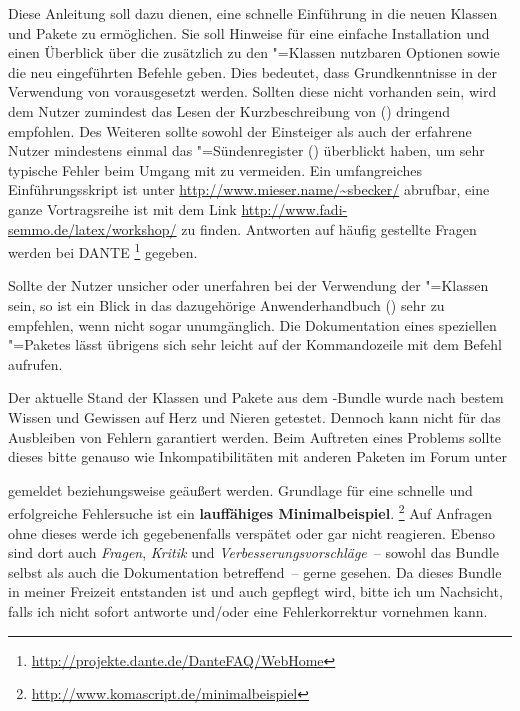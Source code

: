 \documentclass[%
  english,ngerman,%
  headings=optiontoheadandtoc,captions=tableheading,numbers=noenddot,%
  chapterpage,cdfoot,%
]{tudscrman}
\begin{document}
Diese Anleitung soll dazu dienen, eine schnelle Einführung in die neuen Klassen
und Pakete zu ermöglichen. Sie soll Hinweise für eine einfache Installation und 
einen Überblick über die zusätzlich zu den \KOMAScript"=Klassen nutzbaren 
Optionen sowie die neu eingeführten Befehle geben. Dies bedeutet, dass 
Grundkenntnisse in der Verwendung von  vorausgesetzt werden. 
Sollten 
diese nicht vorhanden sein, wird dem Nutzer zumindest das Lesen der 
Kurzbeschreibung von  () dringend empfohlen. Des 
Weiteren sollte sowohl der Einsteiger als auch der erfahrene Nutzer mindestens 
einmal das "=Sündenregister () überblickt haben, 
um sehr typische Fehler beim Umgang mit  zu vermeiden. Ein 
umfangreiches Einführungsskript ist unter \url{http://www.mieser.name/~sbecker/} 
abrufbar, eine ganze Vortragsreihe ist mit dem Link
\url{http://www.fadi-semmo.de/latex/workshop/} zu finden. Antworten auf häufig 
gestellte Fragen werden bei DANTE%
\footnote{\url{http://projekte.dante.de/DanteFAQ/WebHome}} gegeben.

Sollte der Nutzer unsicher oder unerfahren bei der Verwendung der 
\KOMAScript"=Klassen sein, so ist ein Blick in das dazugehörige Anwenderhandbuch
() sehr zu empfehlen, wenn nicht sogar unumgänglich. Die 
Dokumentation eines speziellen "=Paketes lässt übrigens sich sehr 
leicht 
auf der Kommandozeile mit dem Befehl  aufrufen.

Der aktuelle Stand der Klassen und Pakete aus dem \TUDScript-Bundle wurde nach 
bestem Wissen und Gewissen auf Herz und Nieren getestet. Dennoch kann nicht für 
das Ausbleiben von Fehlern garantiert werden. Beim Auftreten eines Problems 
sollte dieses bitte genauso wie Inkompatibilitäten mit anderen Paketen im Forum 
unter
\begin{quote}
\forum%
\end{quote}
gemeldet beziehungsweise geäußert werden. Grundlage für eine schnelle und 
erfolgreiche Fehlersuche ist ein \textbf{lauffähiges Minimalbeispiel}.%
\footnote{\label{fn:mwe}\url{http://www.komascript.de/minimalbeispiel}}
Auf Anfragen ohne dieses werde ich gegebenenfalls verspätet oder gar nicht 
reagieren. Ebenso sind dort auch \emph{Fragen}, \emph{Kritik} und 
\emph{Verbesserungsvorschläge}~-- sowohl das Bundle selbst als auch die 
Dokumentation betreffend~-- gerne gesehen. Da dieses Bundle in meiner Freizeit 
entstanden ist und auch gepflegt wird, bitte ich um Nachsicht, falls ich nicht 
sofort antworte und/oder eine Fehlerkorrektur vornehmen kann.
\end{document}
